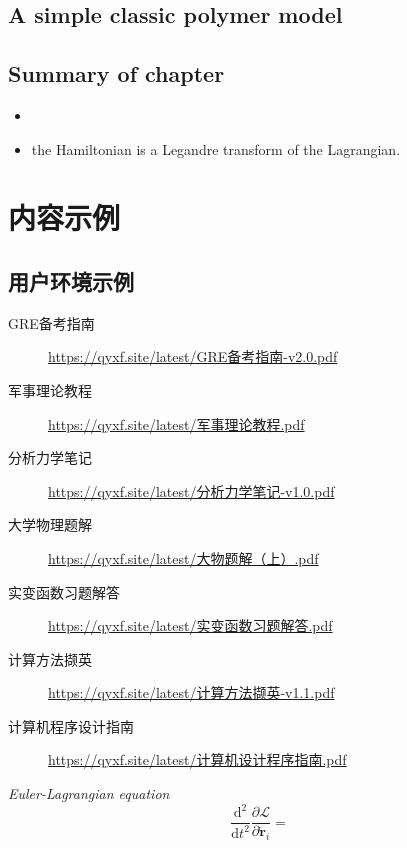 \documentclass[
  10pt,
  twoside,
  openany,
  b5paper, %
  colorscheme = bootstrap-v4, %
]{qyxf-book}
\newcommand{\dd}[2]{\dfrac{\md^2 #1}{\md #2^2}}
\newcommand{\p}[2]{\dfrac{\partial #1}{\partial #2}}
\newcommand{\md}{\mathrm{d}}
\newcommand{\vr}{\boldsymbol{r}}
\newcommand{\dvr}{\dot{\vr}}
\newcommand{\lag}{\mathcal{L}} %
\begin{document}
\section{A simple classic polymer model}





\section{Summary of chapter}

\begin{itemize}
	\item 
	\item the Hamiltonian is a Legandre transform of the Lagrangian.
\end{itemize}








\chapter{内容示例}
\section{用户环境示例}

\begin{tcolorbox}
	\begin{description}
		\item [GRE备考指南] \url{https://qyxf.site/latest/GRE备考指南-v2.0.pdf}
		\item [军事理论教程] \url{https://qyxf.site/latest/军事理论教程.pdf}
		\item [分析力学笔记] \url{https://qyxf.site/latest/分析力学笔记-v1.0.pdf}
		\item [大学物理题解] \url{https://qyxf.site/latest/大物题解（上）.pdf}
		\item [实变函数习题解答] \url{https://qyxf.site/latest/实变函数习题解答.pdf}
		\item [计算方法撷英] \url{https://qyxf.site/latest/计算方法撷英-v1.1.pdf}
		\item [计算机程序设计指南] \url{https://qyxf.site/latest/计算机设计程序指南.pdf}
	\end{description}
\end{tcolorbox}

\begin{pequation}
	\textit{Euler-Lagrangian equation}
	$$
	\dd{}{t}\p{\lag}{\dvr_i}=
	$$
\end{pequation}
\end{document}
